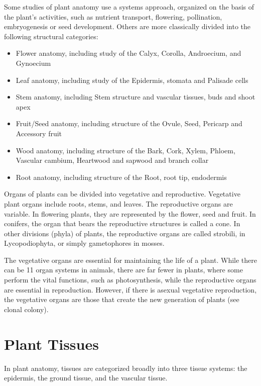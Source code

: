 Some studies of plant anatomy use a systems approach, organized on the basis of the plant's activities, such as nutrient transport, flowering, pollination, embryogenesis or seed development. Others are more classically divided into the following structural categories:

\begin{itemize}
\tightlist
\item
  Flower anatomy, including study of the Calyx, Corolla, Androecium, and Gynoecium
\item
  Leaf anatomy, including study of the Epidermis, stomata and Palisade cells
\item
  Stem anatomy, including Stem structure and vascular tissues, buds and shoot apex
\item
  Fruit/Seed anatomy, including structure of the Ovule, Seed, Pericarp and Accessory fruit
\item
  Wood anatomy, including structure of the Bark, Cork, Xylem, Phloem, Vascular cambium, Heartwood and sapwood and branch collar
\item
  Root anatomy, including structure of the Root, root tip, endodermis
\end{itemize}

Organs of plants can be divided into vegetative and reproductive. Vegetative plant organs include roots, stems, and leaves. The reproductive organs are variable. In flowering plants, they are represented by the flower, seed and fruit. In conifers, the organ that bears the reproductive structures is called a cone. In other divisions (phyla) of plants, the reproductive organs are called strobili, in Lycopodiophyta, or simply gametophores in mosses.

The vegetative organs are essential for maintaining the life of a plant. While there can be 11 organ systems in animals, there are far fewer in plants, where some perform the vital functions, such as photosynthesis, while the reproductive organs are essential in reproduction. However, if there is asexual vegetative reproduction, the vegetative organs are those that create the new generation of plants (see clonal colony).

\hypertarget{plant-tissues}{%
\section{Plant Tissues}\label{plant-tissues}}

In plant anatomy, tissues are categorized broadly into three tissue systems: the epidermis, the ground tissue, and the vascular tissue.

